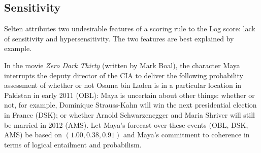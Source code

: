\documentclass[12pt]{article}
\begin{document}
\subsection{Sensitivity}
\label{subsec:aameingi}


Selten attributes two undesirable features of a scoring rule to the
Log score: lack of sensitivity and hypersensitivity. The two
features are best explained by example. 

\begin{example}
  \label{ex:zeumaigh} 
  In the movie \emph{Zero Dark Thirty} (written by Mark Boal), the
  character Maya interrupts the deputy director of the CIA to deliver
  the following probability assessment of whether or not Osama bin
  Laden is in a particular location in Pakistan in early 2011 (OBL):
   Maya is uncertain about other things: whether or not,
  for example, Dominique Strauss-Kahn will win the next presidential
  election in France (DSK); or whether Arnold Schwarzenegger and Maria
  Shriver will still be married in 2012 (AMS). Let Maya's forecast
  over these events (OBL, DSK, AMS) be based on $(1.00,0.38,0.91)$ and
  Maya's commitment to coherence in terms of logical entailment and
  probabilism.
\end{example}
\end{document}
